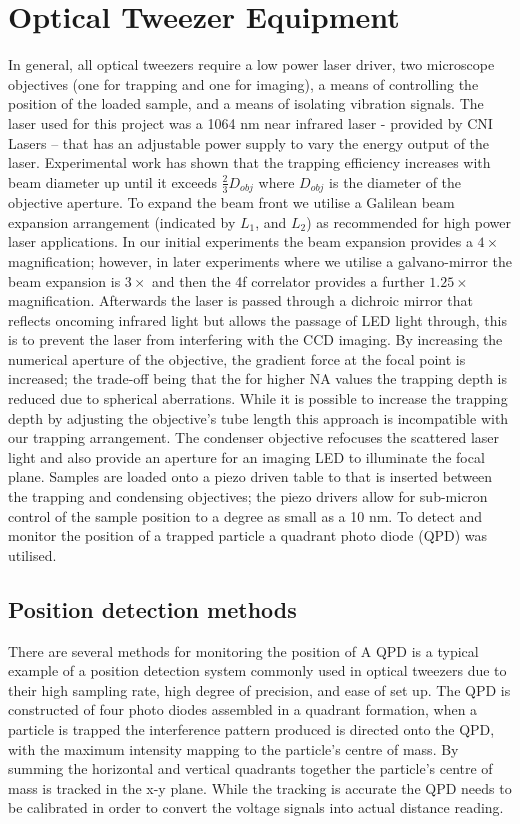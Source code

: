 \section{Optical Tweezer Equipment}
In general, all optical tweezers require a low power laser driver, two microscope objectives (one for trapping and one for imaging), a means of controlling the position of the loaded sample, and a means of isolating vibration signals. The laser used for this project was a 1064 nm near infrared laser - provided by CNI Lasers – that has an adjustable power supply to vary the energy output of the laser. Experimental work has shown that the trapping efficiency increases with beam diameter up until it exceeds $\frac{2}{3}D_{obj}$ where $D_{obj}$ is the diameter of the objective aperture. To expand the beam front we utilise a Galilean beam expansion arrangement (indicated by $L_1$, and $L_2$) as recommended for high power laser applications. In our initial experiments the beam expansion provides a $4\times$ magnification; however, in later experiments where we utilise a galvano-mirror the beam expansion is $3\times$ and then the 4f correlator provides a further $1.25\times$ magnification. Afterwards the laser is passed through a dichroic mirror that reflects oncoming infrared light but allows the passage of LED light through, this is to prevent the laser from interfering with the CCD imaging. By increasing the numerical aperture of the objective, the gradient force at the focal point is increased; the trade-off being that the for higher NA values the trapping depth is reduced due to spherical aberrations. While it is possible to increase the trapping depth by adjusting the objective's tube length this approach is incompatible with our trapping arrangement. The condenser objective refocuses the scattered laser light and also provide an aperture for an imaging LED to illuminate the focal plane. Samples are loaded onto a piezo driven table to that is inserted between the trapping and condensing objectives; the piezo drivers allow for sub-micron control of the sample position to a degree as small as a 10 nm. To detect and monitor the position of a trapped particle a quadrant photo diode (QPD) was utilised. 

\subsection{Position detection methods}
There are several methods for monitoring the position of 
A QPD is a typical example of a position detection system commonly used 
in optical tweezers due to their high sampling rate, high degree of 
precision, and ease of set up. The QPD is constructed of four photo 
diodes assembled in a quadrant formation, when a particle is trapped the 
interference pattern produced is directed onto the QPD, with the maximum 
intensity mapping to the particle's centre of mass. By summing the 
horizontal and vertical quadrants together the particle's centre of mass 
is tracked in the x-y plane. While the tracking is accurate the QPD 
needs to be calibrated in order to convert the voltage signals into 
actual distance reading. 


